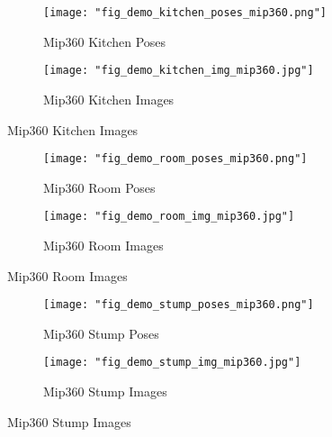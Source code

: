 \begin{figure}
    \centering
        \begin{subfigure}{0.48\linewidth}
            \texttt{[image: "fig\_demo\_kitchen\_poses\_mip360.png"]}
            \caption{Mip360 Kitchen Poses}
        \end{subfigure}
        \begin{subfigure}{0.48\linewidth}
            \texttt{[image: "fig\_demo\_kitchen\_img\_mip360.jpg"]}
            \caption{Mip360 Kitchen Images}
        \end{subfigure}
\end{figure}

\begin{figure}
    \centering
        \begin{subfigure}{0.48\linewidth}
            \texttt{[image: "fig\_demo\_room\_poses\_mip360.png"]}
            \caption{Mip360 Room Poses}
        \end{subfigure}
        \begin{subfigure}{0.48\linewidth}
            \texttt{[image: "fig\_demo\_room\_img\_mip360.jpg"]}
            \caption{Mip360 Room Images}
        \end{subfigure}
\end{figure}

\begin{figure}
    \centering
        \begin{subfigure}{0.48\linewidth}
            \texttt{[image: "fig\_demo\_stump\_poses\_mip360.png"]}
            \caption{Mip360 Stump Poses}
        \end{subfigure}
        \begin{subfigure}{0.48\linewidth}
            \texttt{[image: "fig\_demo\_stump\_img\_mip360.jpg"]}
            \caption{Mip360 Stump Images}
        \end{subfigure}
\end{figure}





